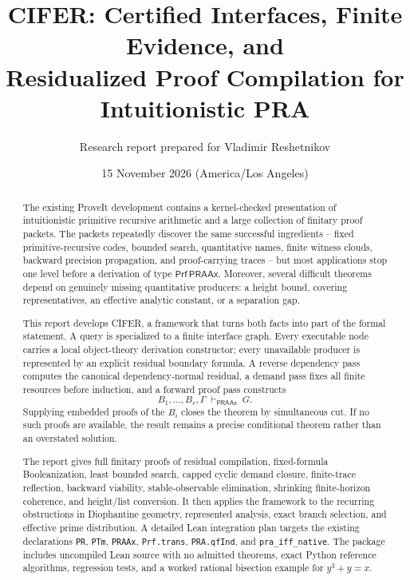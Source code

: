 \documentclass[11pt]{article}
\title{\textbf{CIFER: Certified Interfaces, Finite Evidence, and\\Residualized Proof Compilation for Intuitionistic PRA}}
\author{Research report prepared for Vladimir Reshetnikov}
\date{15 November 2026 (America/Los Angeles)}
\newcommand{\PRAAx}{\ensuremath{\mathsf{PRAAx}}}
\newcommand{\Prf}{\ensuremath{\mathsf{Prf}}}
\newcommand{\code}[1]{\texttt{#1}}
\newcommand{\CIFER}{\textsc{CIFER}}
\begin{document}
\maketitle

\begin{abstract}
The existing ProveIt development contains a kernel-checked presentation of intuitionistic primitive recursive arithmetic and a large collection of finitary proof packets.  The packets repeatedly discover the same successful ingredients -- fixed primitive-recursive codes, bounded search, quantitative names, finite witness clouds, backward precision propagation, and proof-carrying traces -- but most applications stop one level before a derivation of type \(\Prf\,\PRAAx\).  Moreover, several difficult theorems depend on genuinely missing quantitative producers: a height bound, covering representatives, an effective analytic constant, or a separation gap.

This report develops \CIFER, a framework that turns both facts into part of the formal statement.  A query is specialized to a finite interface graph.  Every executable node carries a local object-theory derivation constructor; every unavailable producer is represented by an explicit residual boundary formula.  A reverse dependency pass computes the canonical dependency-normal residual, a demand pass fixes all finite resources before induction, and a forward proof pass constructs
\[
   B_1,\ldots,B_r,\Gamma\ \vdash_{\PRAAx}\ G.
\]
Supplying embedded proofs of the \(B_i\) closes the theorem by simultaneous cut.  If no such proofs are available, the result remains a precise conditional theorem rather than an overstated solution.

The report gives full finitary proofs of residual compilation, fixed-formula Booleanization, least bounded search, capped cyclic demand closure, finite-trace reflection, backward viability, stable-observable elimination, shrinking finite-horizon coherence, and height/list conversion.  It then applies the framework to the recurring obstructions in Diophantine geometry, represented analysis, exact branch selection, and effective prime distribution.  A detailed Lean integration plan targets the existing declarations \code{PR}, \code{PTm}, \code{PRAAx}, \code{Prf.trans}, \code{PRA.qfInd}, and \code{pra\_iff\_native}.  The package includes uncompiled Lean source with no admitted theorems, exact Python reference algorithms, regression tests, and a worked rational bisection example for \(y^3+y=x\).
\end{abstract}

\tableofcontents
\newpage

















\end{document}
